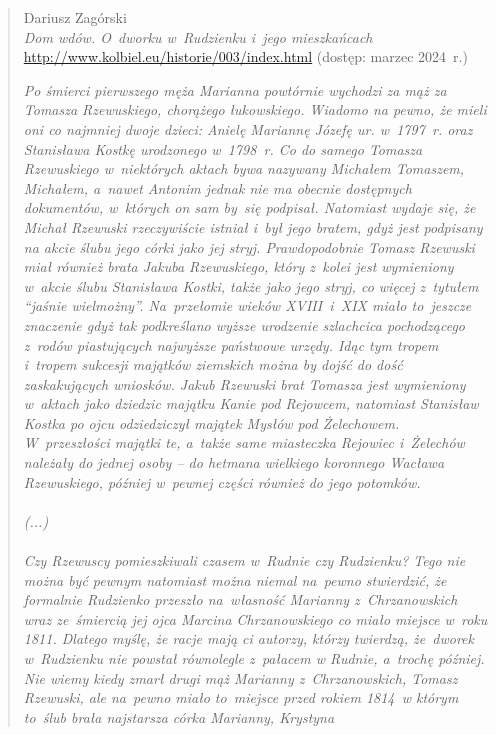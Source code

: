 \newpage
\begin{quote}{Dariusz Zagórski \\ \null\hfill \emph{Dom wdów. O~dworku 
    w~Rudzienku i~jego mieszkańcach} \\ \null\hfill 
    \url{http://www.kolbiel.eu/historie/003/index.html} (dostęp: marzec 
    2024~r.)}

\textit{Po śmierci pierwszego męża Marianna powtórnie wychodzi za mąż za 
Tomasza Rzewuskiego, chorążego łukowskiego. Wiadomo na pewno, że mieli oni co 
najmniej dwoje dzieci: Anielę Mariannę Józefę ur. w~1797~r. oraz Stanisława 
Kostkę urodzonego w~1798~r. Co do samego Tomasza Rzewuskiego w~niektórych 
aktach bywa nazywany Michałem Tomaszem, Michałem, a~nawet Antonim jednak nie 
ma obecnie dostępnych dokumentów, w~których on sam by~się podpisał. Natomiast 
wydaje się, że Michał Rzewuski rzeczywiście istniał i~był jego bratem, gdyż 
jest podpisany na akcie ślubu jego córki jako jej stryj. Prawdopodobnie 
Tomasz Rzewuski miał również brata Jakuba Rzewuskiego, który z~kolei jest 
wymieniony w~akcie ślubu Stanisława Kostki, także jako jego stryj, co więcej 
z~tytułem \enquote{jaśnie wielmożny}. Na~przełomie wieków XVIII~i~XIX miało 
to~jeszcze znaczenie gdyż tak podkreślano wyższe urodzenie szlachcica 
pochodzącego z~rodów piastujących najwyższe państwowe urzędy. Idąc tym tropem 
i~tropem sukcesji majątków ziemskich można by dojść do dość zaskakujących 
wniosków. Jakub Rzewuski brat Tomasza jest wymieniony w~aktach jako dziedzic 
majątku Kanie pod Rejowcem, natomiast Stanisław Kostka po ojcu odziedziczył 
majątek Mysłów pod Żelechowem. W~przeszłości majątki te, a~także same 
miasteczka Rejowiec i~Żelechów należały do jednej osoby – do hetmana 
wielkiego koronnego Wacława Rzewuskiego, później w~pewnej części również do 
jego potomków.
\\
\\
(...)
\\
\\
Czy Rzewuscy pomieszkiwali czasem w~Rudnie czy Rudzienku? Tego nie można być 
pewnym natomiast można niemal na~pewno stwierdzić, że formalnie Rudzienko 
przeszło na~własność Marianny z~Chrzanowskich wraz ze~śmiercią jej ojca 
Marcina Chrzanowskiego co miało miejsce w~roku 1811. Dlatego myślę, że racje 
mają ci autorzy, którzy twierdzą, że~dworek w~Rudzienku nie powstał 
równolegle z~pałacem w Rudnie, a~trochę później. Nie wiemy kiedy zmarł drugi 
mąż Marianny z~Chrzanowskich, Tomasz Rzewuski, ale na~pewno miało to~miejsce 
przed rokiem 1814~w którym to~ślub brała najstarsza córka Marianny, Krystyna 
}
\end{quote}
